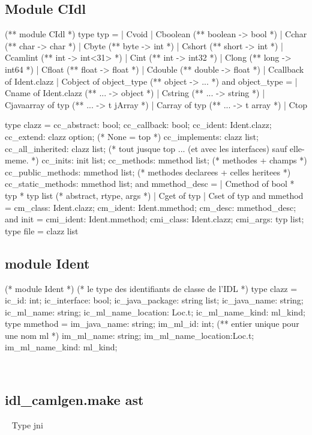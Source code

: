 \documentclass[a4paper, 11pt]{report}
\begin{document}
\subsection*{Module CIdl}
\begin{OCaml}
(**  module CIdl  *)
type typ =
  | Cvoid
  | Cboolean (** boolean -> bool *)
  | Cchar (** char -> char *)
  | Cbyte (** byte -> int *)
  | Cshort (** short -> int *)
  | Ccamlint (** int -> int<31> *)
  | Cint (** int -> int32 *)
  | Clong (** long -> int64 *)
  | Cfloat (** float -> float *)
  | Cdouble (** double -> float *)
  | Ccallback of Ident.clazz
  | Cobject of object_type (** object -> ... *)
and object_type = 
  | Cname of Ident.clazz (** ... -> object *)
  | Cstring (** ... -> string *)
  | Cjavaarray of typ (** ... -> t jArray *) 
  | Carray of typ (** ... -> t array *) 
  | Ctop

type clazz = {
    cc_abstract: bool;
    cc_callback: bool;
    cc_ident: Ident.clazz;
    cc_extend: clazz option; (* None = top *)
    cc_implements: clazz list;
    cc_all_inherited: clazz list; (* tout jusque top ... (et avec les interfaces) sauf elle-meme. *)
    cc_inits: init list;
    cc_methods: mmethod list; (* methodes + champs *)
    cc_public_methods: mmethod list; (* methodes declarees + celles heritees *)
    cc_static_methods: mmethod list; 
  }
and mmethod_desc = 
  | Cmethod of bool * typ * typ list (* abstract, rtype, args *)
  | Cget of typ
  | Cset of typ
and mmethod = {
    cm_class: Ident.clazz;
    cm_ident: Ident.mmethod; 
    cm_desc: mmethod_desc;
  }         
and init = {
    cmi_ident: Ident.mmethod;
    cmi_class: Ident.clazz;
    cmi_args: typ list;
  }
type file = clazz list
\end{OCaml}

\subsection*{module Ident}
\begin{OCaml}
(* module Ident  *)
(* le type des identifiants de classe de l'IDL *)
type clazz = {
    ic_id: int;
    ic_interface: bool;
    ic_java_package: string list;
    ic_java_name: string;
    ic_ml_name: string;
    ic_ml_name_location: Loc.t;
    ic_ml_name_kind: ml_kind;
  }
type mmethod = {
    im_java_name: string;
    im_ml_id: int; (** entier unique pour une nom ml *)
    im_ml_name: string;
    im_ml_name_location:Loc.t;
    im_ml_name_kind: ml_kind;
  }
\end{OCaml}
\ 

\subsection*{idl\_camlgen.make ast}
\ 
\newline
Type jni
\end{document}
